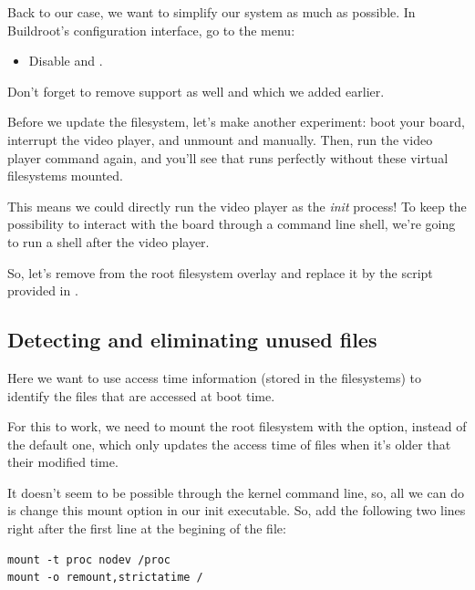 Back to our case, we want to simplify our system as much as possible.
In Buildroot's configuration interface, go to the  menu:

\begin{itemize}
\item Disable  and
      .
\end{itemize}

Don't forget to remove  support as well and
 which we added earlier.

Before we update the filesystem, let's make another experiment: boot
your board, interrupt the video player, and unmount  and
 manually. Then, run the video player command again, and
you'll see that  runs perfectly without these virtual
filesystems mounted.

This means we could directly run the video player as the {\em init}
process! To keep the possibility to interact with the board through
a command line shell, we're going to run a shell after the video player.

So, let's remove  from the root
filesystem overlay and replace it by the  script
provided in .

\subsection{Detecting and eliminating unused files}

Here we want to use access time information (stored in the filesystems)
to identify the files that are accessed at boot time.

For this to work, we need to mount the root filesystem with the
 option, instead of the default  one,
which only updates the access time of files when it's older that their
modified time.

It doesn't seem to be possible through the kernel command line, so,
all we can do is change this mount option in our init executable.
So, add the following two lines right after the first line at
the begining of the  file:

\begin{verbatim}
mount -t proc nodev /proc
mount -o remount,strictatime /
\end{verbatim}

